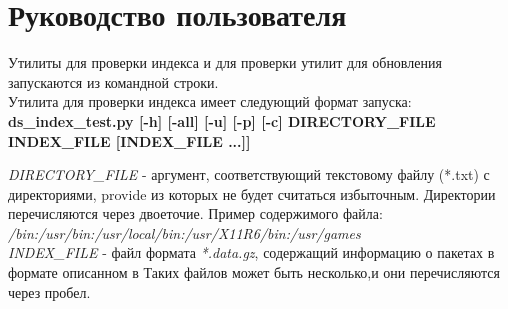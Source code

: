 \appendix
\section{Руководство пользователя}
Утилиты для проверки индекса и для проверки утилит для обновления
запускаются из командной строки. \\
Утилита для проверки индекса имеет следующий формат запуска: \\
\textbf{ds\_index\_test.py [-h] [-all] [-u] [-p] [-c] DIRECTORY\_FILE INDEX\_FILE [INDEX\_FILE ...]]}

\emph{DIRECTORY\_FILE} - аргумент, соответствующий текстовому файлу (*.txt) с 
директориями, provide из которых не будет считаться избыточным. Директории
перечисляются  через двоеточие. Пример содержимого файла:
\textit{/bin:/usr/bin:/usr/local/bin:/usr/X11R6/bin:/usr/games}\\

\emph{INDEX\_FILE }- файл формата \textit{*.data.gz}, содержащий информацию о пакетах
в формате описанном в %
 Таких файлов может быть несколько,и они перечисляются через пробел.\\

